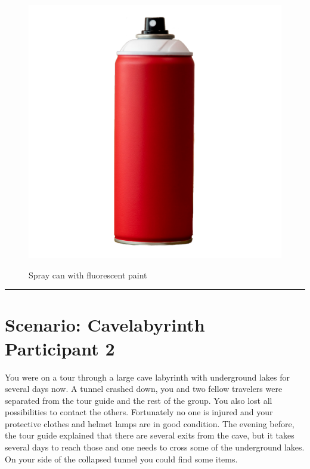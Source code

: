 \documentclass{article}
\begin{document}
    \begin{figure}[H]
        \centering
        \begin{minipage}{0.25\textwidth}
            \centering
            \includegraphics[width=\textwidth]{../SurvivalItemImages/spraycan}
        \end{minipage}\hfill
        \begin{minipage}{0.7\textwidth}
            \centering
            \Large Spray can with fluorescent paint
        \end{minipage}
    \end{figure}
    \vspace{-0.8em}
    \noindent\rule{\textwidth}{0.4pt}
            
    \clearpage
    \section*{Scenario: \textmd{Cavelabyrinth} \hfill Participant \textmd{2}}
    \Large You were on a tour through a large cave labyrinth with underground lakes for several days now. A tunnel crashed down, you and two fellow travelers were separated from the tour guide and the rest of the group. You also lost all possibilities to contact the others. Fortunately no one is injured and your protective clothes and helmet lamps are in good condition. The evening before, the tour guide explained that there are several exits from the cave, but it takes several days to reach those and one needs to cross some of the underground lakes. On your side of the collapsed tunnel you could find some items.\clearpage
        
\end{document}
